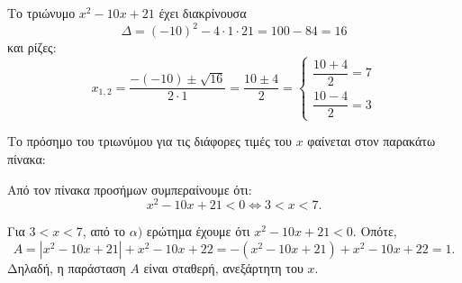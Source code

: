 
\begin{alist}
\item Το τριώνυμο $x^2 - 10x + 21$ έχει διακρίνουσα
\[\Delta = (-10)^2 - 4 \cdot 1 \cdot 21 = 100 - 84 = 16\]
και ρίζες:
\[x_{1,2} = \dfrac{-(-10) \pm \sqrt{16}}{2 \cdot 1} = \dfrac{10 \pm 4}{2} = \begin{cases} \dfrac{10 + 4}{2} = 7 \\ \dfrac{10 - 4}{2} = 3 \end{cases}\]

Το πρόσημο του τριωνύμου για τις διάφορες τιμές του $x$ φαίνεται στον παρακάτω πίνακα:
\begin{center}
\end{center}

Από τον πίνακα προσήμων συμπεραίνουμε ότι:
\[x^2 - 10x + 21 < 0 \Leftrightarrow 3 < x < 7.\]

\item Για $3 < x < 7$, από το $\alpha)$ ερώτημα έχουμε ότι $x^2 - 10x + 21 < 0$.
Οπότε,
\[A = |x^2 - 10x + 21| + x^2 - 10x + 22 = -(x^2 - 10x + 21) + x^2 - 10x + 22 = 1.\]
Δηλαδή, η παράσταση $A$ είναι σταθερή, ανεξάρτητη του $x$.
\end{alist}


